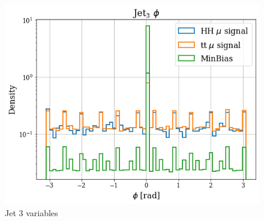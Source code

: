 \documentclass[../main.tex]{subfiles}
\begin{document}
\begin{figure}[h]
\begin{minipage}[b]{0.33\linewidth}
    \centering
    \includegraphics[width=1\linewidth]{Chapters/Plots/Hist_1mu_jet3_Phi.png}
  \end{minipage}
  \caption{Jet 3 variables}
\end{figure}
\end{document}
